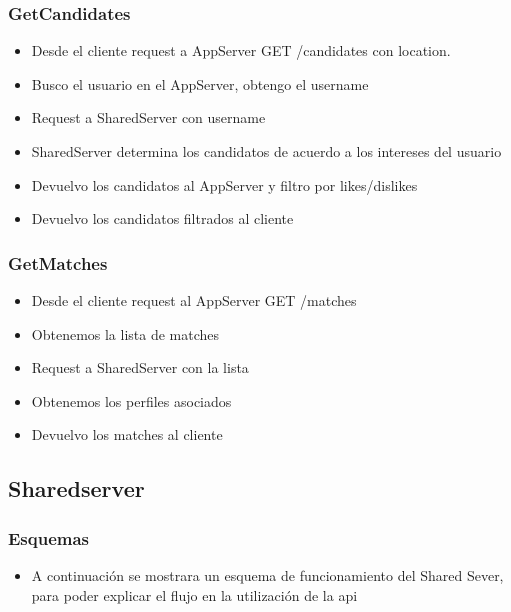 \documentclass[letterpaper,10pt,english]{sphinxmanual}
\begin{document}
\subsubsection{GetCandidates}
\label{manuals:getcandidates}\begin{itemize}
\item {} 
Desde el cliente request a AppServer  GET /candidates con location.

\item {} 
Busco el usuario en el AppServer, obtengo el username

\item {} 
Request a SharedServer con username

\item {} 
SharedServer determina los candidatos de acuerdo a los intereses del usuario

\item {} 
Devuelvo los candidatos al AppServer y filtro por likes/dislikes

\item {} 
Devuelvo los candidatos filtrados al cliente

\end{itemize}


\subsubsection{GetMatches}
\label{manuals:getmatches}\begin{itemize}
\item {} 
Desde el cliente request al AppServer GET /matches

\item {} 
Obtenemos la lista de matches

\item {} 
Request a SharedServer con la lista

\item {} 
Obtenemos los perfiles asociados

\item {} 
Devuelvo los matches al cliente

\end{itemize}


\subsection{Sharedserver}
\label{manuals:sharedserver}

\subsubsection{Esquemas}
\label{manuals:id1}\begin{itemize}
\item {} 
A continuación se mostrara un esquema de funcionamiento del Shared Sever, para poder explicar el flujo en la utilización de la api

\end{itemize}
\end{document}

